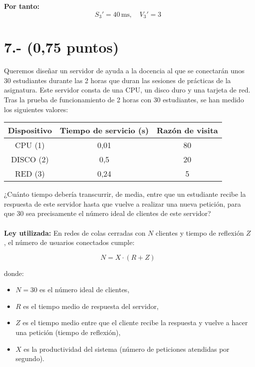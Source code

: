 \documentclass[a4paper,12pt]{article}
\begin{document}
\begin{enumerate}

    \textbf{Por tanto:}
    \[
    S_3' = 40 \, \text{ms}, \quad V_3' = \boxed{3}
    \]
\end{enumerate}

\section*{7.- (0,75 puntos)}
Queremos diseñar un servidor de ayuda a la docencia al que se conectarán unos 30 estudiantes durante las 2 horas que duran las sesiones de prácticas de la asignatura. Este servidor consta de una CPU, un disco duro y una tarjeta de red. Tras la prueba de funcionamiento de 2 horas con 30 estudiantes, se han medido los siguientes valores:

\begin{center}
\begin{tabular}{|c|c|c|}
\hline
\textbf{Dispositivo} & \textbf{Tiempo de servicio (s)} & \textbf{Razón de visita} \\
\hline
CPU (1) & 0,01 & 80 \\
DISCO (2) & 0,5 & 20 \\
RED (3) & 0,24 & 5 \\
\hline
\end{tabular}
\end{center}

¿Cuánto tiempo debería transcurrir, de media, entre que un estudiante recibe la respuesta de este servidor hasta que vuelve a realizar una nueva petición, para que 30 sea precisamente el número ideal de clientes de este servidor?\\\\


\textbf{Ley utilizada:} En redes de colas cerradas con $N$ clientes y tiempo de reflexión $Z$, el número de usuarios conectados cumple:

\[
N = X \cdot (R + Z)
\]

donde:
\begin{itemize}
    \item $N = 30$ es el número ideal de clientes,
    \item $R$ es el tiempo medio de respuesta del servidor,
    \item $Z$ es el tiempo medio entre que el cliente recibe la respuesta y vuelve a hacer una petición (tiempo de reflexión),
    \item $X$ es la productividad del sistema (número de peticiones atendidas por segundo).
\end{itemize}
\end{document}
